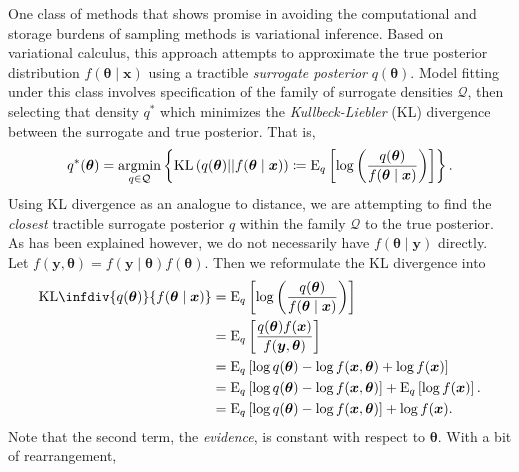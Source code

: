 One class of methods that shows promise in avoiding the computational and 
    storage burdens of sampling methods is variational inference.\needcite 
    Based on variational calculus, this approach attempts to approximate the 
    true posterior distribution
    $f(\bm{\theta}\mid\bm{x})$ using a tractible \emph{surrogate posterior} 
    $q(\bm{\theta})$.  Model fitting under this class involves specification of 
    the family of surrogate densities $\mathcal{Q}$, then selecting that density 
    $q^*$ which minimizes the \emph{Kullbeck-Liebler} (KL) divergence between 
    the surrogate and true posterior.  That is,
    \[
        q^*(\bm{\theta}) = \operatorname*{argmin}_{q\in\mathcal{Q}}\left\lbrace
        \text{KL}\left(q(\bm{\theta})||f(\bm{\theta}\mid\bm{x})\right) 
        \coloneqq
        \text{E}_{q}\left[\log\left(
        \frac{q(\bm{\theta})}{f(\bm{\theta}\mid\bm{x})}
        \right)\right]
        \right\rbrace.
    \]
    Using KL divergence as an analogue to distance, we are attempting to find
    the \emph{closest} tractible surrogate posterior $q$ within the family 
    $\mathcal{Q}$ to the true posterior.
    As has been explained however, we do not necessarily have 
    $f(\bm{\theta}\mid\bm{y})$ directly.  Let 
    $f(\bm{y},\bm{\theta}) = f(\bm{y}\mid\bm{\theta})f(\bm{\theta})$.
    Then we reformulate the KL divergence into
    \[
        \begin{aligned}
        \text{KL}\infdiv{q(\bm{\theta})}{f(\bm{\theta}\mid\bm{x})}
            &=\text{E}_{q}\left[\log\left(
                \frac{q(\bm{\theta})}{f(\bm{\theta}\mid\bm{x})}
                \right)\right]\\
            &= \text{E}_{q}\left[
                \frac{q(\bm{\theta})f(\bm{x})}{f(\bm{y},\bm{\theta})}
                \right]\\
            &= \text{E}_{q}\left[
                \log q(\bm{\theta}) - \log f(\bm{x},\bm{\theta}) 
                + \log f(\bm{x})
                \right]\\
            &= \text{E}_{q}\left[
                \log q(\bm{\theta}) - \log f(\bm{x},\bm{\theta})\right] + 
                    \text{E}_{q}\left[\log f(\bm{x})\right].\\
            &= \text{E}_{q}\left[
                \log q(\bm{\theta}) - \log f(\bm{x},\bm{\theta})\right] + 
                   \log f(\bm{x}).
        \end{aligned}
    \]
    Note that the second term, the \emph{evidence}, is constant with respect to 
    $\bm{\theta}$.  With a bit of rearrangement,
